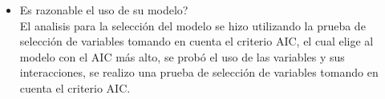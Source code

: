 \documentclass[12pt,a4paper]{report}
\begin{document}
\begin{enumerate}
\begin{itemize}
\begin{verbatim}
attr(,"class")
[1] "group"
> 
\end{verbatim}
\[ \beta = (XX')^{-1} X' Y\]
\begin{align*}
\beta = \begin{bmatrix}
24.60\\
-14.65\\
4.00\\
4.80\\
-16.20\\
2.40\\
0.00\\
41.40\\
-7.20\\
0.00\\
42.65\\
18.45\\
0.00\\
-25.60\\
-20.60\\
0.00\\
-31.60\\
2.60\\
0.00\\
-4.00\\
38.00\\
0.00\\
40.00\\
-9.20\\
0.00\\
0.00\\
0.00\\
0.00\\
\end{bmatrix}
\end{align*}
\item[c)] Es razonable el uso de su modelo?\\
El analisis para la selección del modelo se hizo utilizando la prueba de selección de variables tomando en cuenta el criterio AIC,
el cual elige al modelo con el AIC más alto, se probó el uso de las variables y sus interacciones, se realizo una prueba de selección de variables tomando en cuenta el criterio AIC. \\



\end{itemize}
\end{enumerate}
\end{document}
